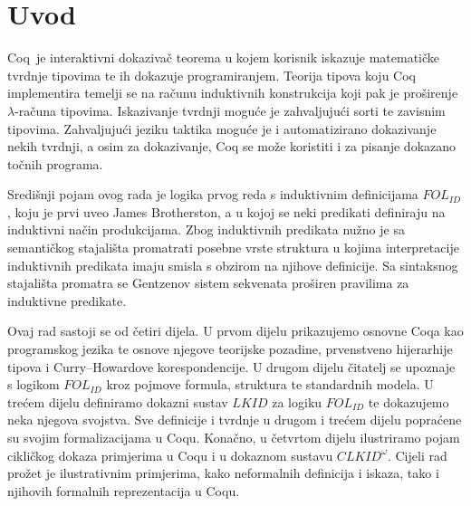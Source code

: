 \chapter{Uvod}\label{cha:uvod}
Coq\, je interaktivni dokazivač teorema u kojem
korisnik iskazuje matematičke tvrdnje tipovima te ih dokazuje programiranjem.
Teorija tipova koju Coq implementira temelji se na računu induktivnih konstrukcija
koji pak je proširenje \(\lambda\)-računa tipovima.
Iskazivanje tvrdnji moguće je zahvaljujući sorti \coqprop{} te zavisnim tipovima.
Zahvaljujući jeziku taktika moguće je i automatizirano dokazivanje nekih tvrdnji,
a osim za dokazivanje, Coq se može koristiti i za pisanje dokazano točnih programa.

Središnji pojam ovog rada je logika prvog reda s induktivnim definicijama
\(\mathit{FOL}_{\mathit{ID}}\), koju je prvi uveo James Brotherston, a u kojoj
se neki predikati definiraju na induktivni način produkcijama.
Zbog induktivnih predikata nužno je sa semantičkog stajališta promatrati
posebne vrste struktura u kojima interpretacije induktivnih predikata imaju smisla
s obzirom na njihove definicije.
Sa sintaksnog stajališta promatra se Gentzenov sistem sekvenata proširen
pravilima za induktivne predikate.

Ovaj rad sastoji se od četiri dijela.
U prvom dijelu prikazujemo osnovne Coqa kao programskog jezika te osnove njegove
teorijske pozadine, prvenstveno hijerarhije tipova i Curry--Howardove korespondencije.
U drugom dijelu čitatelj se upoznaje s logikom \(\mathit{FOL}_{\mathit{ID}}\) kroz
pojmove formula, struktura te standardnih modela.
U trećem dijelu definiramo dokazni sustav \(\mathit{LKID}\) za logiku \(\mathit{FOL}_{\mathit{ID}}\)
te dokazujemo neka njegova svojstva.
Sve definicije i tvrdnje u drugom i trećem dijelu popraćene su svojim formalizacijama u Coqu.
Konačno, u četvrtom dijelu ilustriramo pojam cikličkog dokaza primjerima u Coqu i u dokaznom
sustavu \(\mathit{CLKID}^{\omega}\)\!.
Cijeli rad prožet je ilustrativnim primjerima, kako neformalnih definicija i iskaza,
tako i njihovih formalnih reprezentacija u Coqu.



